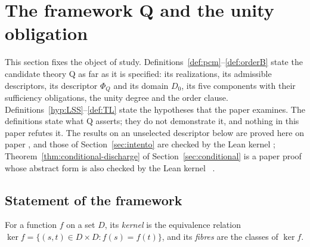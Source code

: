 \section{The framework Q and the unity obligation}\label{sec:obligacion}
This section fixes the object of study. Definitions~\ref{def:pcm}--\ref{def:orderB} state the candidate theory Q as far as it is specified: its realizations, its admissible descriptors, its descriptor $\Phi_Q$ and its domain $D_0$, its five components with their sufficiency obligations, the unity degree and the order clause. Definitions~\ref{hyp:LSS}--\ref{def:TL} state the hypotheses that the paper examines. The definitions state what Q asserts; they do not demonstrate it, and nothing in this paper refutes it. The results on an unselected descriptor below are proved here on paper \stA, and those of Section~\ref{sec:intento} are checked by the Lean kernel \stL; Theorem~\ref{thm:conditional-discharge} of Section~\ref{sec:conditional} is a paper proof whose abstract form is also checked by the Lean kernel \stA\ \stL.

\subsection{Statement of the framework}\label{sec:enunciado}
For a function $f$ on a set $D$, its \emph{kernel} is the equivalence relation $\ker f=\{(s,t)\in D\times D: f(s)=f(t)\}$, and its \emph{fibres} are the classes of $\ker f$.

